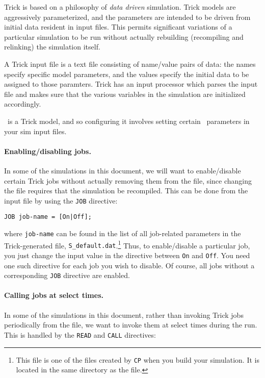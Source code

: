 Trick is based on a philosophy of {\em data driven} simulation.
Trick models are aggressively parameterized,
and the parameters are intended to be driven from initial data resident
in input files.
This permits significant variations of a particular simulation
to be run without actually rebuilding (recompiling and relinking)
the simulation itself.

A Trick input file is a text file consisting of name/value pairs of data:
the names specify specific model parameters,
and the values specify the initial data to be assigned to those paramters.
Trick has an input processor which parses the input file and makes sure that
the various variables in the simulation are initialized accordingly.

\TrickHLA\ is a Trick model, and so configuring it involves setting certain
\TrickHLA\ parameters in your sim input files.

\paragraph{Enabling/disabling jobs.}
In some of the simulations in this document,
we will want to enable/disable certain Trick jobs without
actually removing them from the \sdefine file,
since changing the \sdefine file requires that the simulation be recompiled.
This can be done from the input file by using the {\tt JOB} directive:

\begin{verbatim}
JOB job-name = [On|Off];
\end{verbatim}

where {\tt job-name} can be found in the list of all job-related
parameters in the Trick-generated file, {\tt S\_default.dat}.\footnote{
  This file is one of the files created by {\tt CP} when you build
  your simulation.
  It is located in the same directory as the \sdefine file.
}
Thus, to enable/disable a particular job, you just change the input value
in the directive between {\tt On} and {\tt Off}.
You need one such directive for each job you wish to disable.
Of course, all jobs without a corresponding {\tt JOB} directive are enabled.

\paragraph{Calling jobs at select times.}
In some of the simulations in this document,
rather than invoking Trick jobs periodically from the \sdefine file,
we want to invoke them at select times during the run.
This is handled by the {\tt READ} and {\tt CALL} directives:

